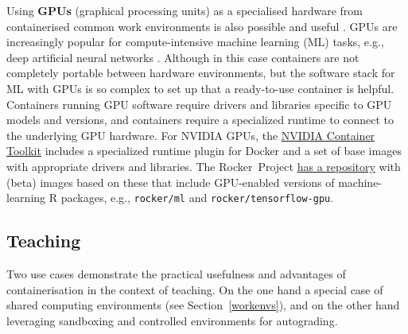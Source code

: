 \label{rocker-gpu} Using \textbf{GPUs} (graphical processing units) as a
specialised hardware from containerised common work environments is also
possible and useful \citep{haydel_enhancing_2015}. GPUs are increasingly
popular for compute-intensive machine learning (ML) tasks, e.g., deep
artificial neural networks \citep{schmidhuber_deep_2015}. Although in
this case containers are not completely portable between hardware
environments, but the software stack for ML with GPUs is so complex to
set up that a ready-to-use container is helpful. Containers running GPU
software require drivers and libraries specific to GPU models and
versions, and containers require a specialized runtime to connect to the
underlying GPU hardware. For NVIDIA GPUs, the
\href{https://github.com/NVIDIA/nvidia-docker}{NVIDIA Container Toolkit}
includes a specialized runtime plugin for Docker and a set of base
images with appropriate drivers and libraries. The Rocker~Project
\href{https://github.com/rocker-org/ml}{has a repository} with (beta)
images based on these that include GPU-enabled versions of
machine-learning R packages, e.g., \texttt{rocker/ml} and
\texttt{rocker/tensorflow-gpu}.

\hypertarget{teaching}{%
\subsection{Teaching}\label{teaching}}

Two use cases demonstrate the practical usefulness and advantages of
containerisation in the context of teaching. On the one hand a special
case of shared computing environments (see Section~\ref{workenvs}), and
on the other hand leveraging sandboxing and controlled environments for
autograding.

